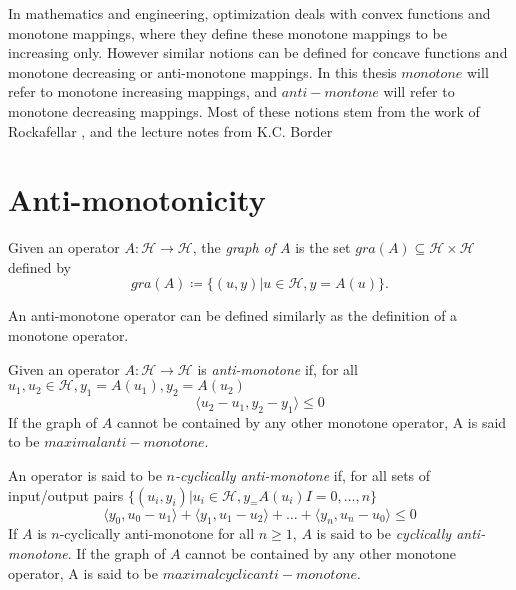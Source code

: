 In mathematics and engineering, optimization deals with convex functions and monotone mappings, where they define these monotone mappings to be increasing only. However similar notions can be defined for concave functions and monotone decreasing or anti-monotone mappings. In this thesis $monotone$ will refer to monotone increasing mappings, and $anti-montone$ will refer to monotone decreasing mappings. Most of these notions stem from the work of Rockafellar \cite{}, and the lecture notes from K.C. Border \cite{}

\section{Anti-monotonicity}
\begin{definition}
    Given an operator $A : \mathcal{H} \rightarrow \mathcal{H}$, the \textit{graph of $A$} is the set $gra(A) \subseteq \mathcal{H} \times \mathcal{H}$ defined by 
    \begin{equation}
        gra(A) \coloneq \{(u,y)\vert u \in \mathcal{H}, y = A(u) \}.
    \end{equation}
\end{definition}
An anti-monotone operator can be defined similarly as the definition of a monotone operator. 
\begin{definition}
Given an operator $A: \mathcal{H} \rightarrow \mathcal{H}$ is \textit{anti-monotone} if, for all $u_1, u_2 \in \mathcal{H}, y_1 = A(u_1), y_2 = A(u_2)$
\begin{equation}
    \langle u_2-u_1, y_2-y_1 \rangle \leq 0
\end{equation}
If the graph of $A$ cannot be contained by any other monotone operator, A is said to be $maximal anti-monotone$.
\end{definition}
\begin{definition}
An operator is said to be \textit{$n$-cyclically anti-monotone} if, for all sets of input/output pairs $\{(u_i,y_i) | u_i \in \mathcal{H}, y_ = A(u_i) I = 0, \ldots ,n \}$
\begin{equation}
    \langle y_0, u_0 -u_1 \rangle + \langle y_1, u_1-u_2 \rangle + \ldots + \langle y_n, u_n-u_0 \rangle \leq 0
\end{equation}
If $A$ is $n$-cyclically anti-monotone for all $n \geq 1$, $A$ is said to be \textit{cyclically anti-monotone}. If the graph of $A$ cannot be contained by any other monotone operator, A is said to be $maximal cyclic anti-monotone$.
\end{definition}

